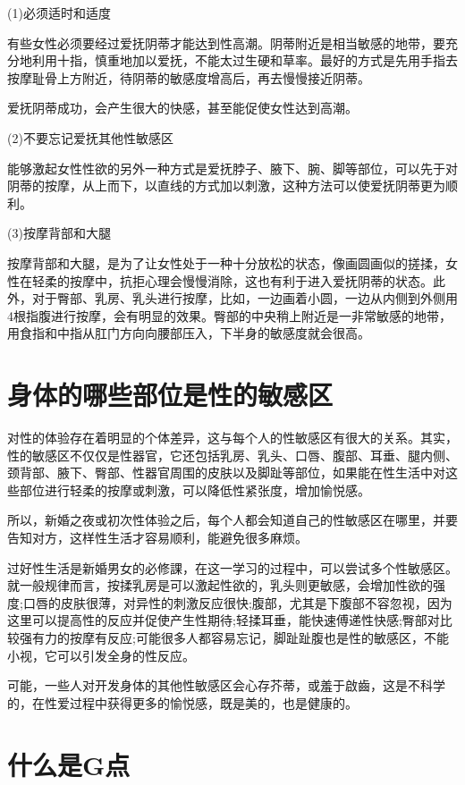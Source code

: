 \documentclass[12pt,UTF8]{ctexbook}
\begin{document}
(1)必须适时和适度

有些女性必须要经过爱抚阴蒂才能达到性高潮。阴蒂附近是相当敏感的地带，要充分地利用十指，慎重地加以爱抚，不能太过生硬和草率。最好的方式是先用手指去按摩耻骨上方附近，待阴蒂的敏感度增高后，再去慢慢接近阴蒂。

爱抚阴蒂成功，会产生很大的快感，甚至能促使女性达到高潮。

(2)不要忘记爱抚其他性敏感区

能够激起女性性欲的另外一种方式是爱抚脖子、腋下、腕、脚等部位，可以先于对阴蒂的按摩，从上而下，以直线的方式加以刺激，这种方法可以使爱抚阴蒂更为顺利。

(3)按摩背部和大腿

按摩背部和大腿，是为了让女性处于一种十分放松的状态，像画圆画似的搓揉，女性在轻柔的按摩中，抗拒心理会慢慢消除，这也有利于进入爱抚阴蒂的状态。此外，对于臀部、乳房、乳头进行按摩，比如，一边画着小圆，一边从内侧到外侧用4根指腹进行按摩，会有明显的效果。臀部的中央稍上附近是一非常敏感的地带，用食指和中指从肛门方向向腰部压入，下半身的敏感度就会很高。

\section{身体的哪些部位是性的敏感区}

对性的体验存在着明显的个体差异，这与每个人的性敏感区有很大的关系。其实，性的敏感区不仅仅是性器官，它还包括乳房、乳头、口唇、腹部、耳垂、腿内侧、颈背部、腋下、臀部、性器官周围的皮肤以及脚趾等部位，如果能在性生活中对这些部位进行轻柔的按摩或刺激，可以降低性紧张度，增加愉悦感。

所以，新婚之夜或初次性体验之后，每个人都会知道自己的性敏感区在哪里，并要告知对方，这样性生活才容易顺利，能避免很多麻烦。

过好性生活是新婚男女的必修課，在这一学习的过程中，可以尝试多个性敏感区。就一般规律而言，按揉乳房是可以激起性欲的，乳头则更敏感，会增加性欲的强度;口唇的皮肤很薄，对异性的刺激反应很快;腹部，尤其是下腹部不容忽视，因为这里可以提高性的反应并促使产生性期待;轻揉耳垂，能快速傅递性快感;臀部对比较强有力的按摩有反应;可能很多人都容易忘记，脚趾趾腹也是性的敏感区，不能小视，它可以引发全身的性反应。

可能，一些人对开发身体的其他性敏感区会心存芥蒂，或羞于啟齒，这是不科学的，在性爱过程中获得更多的愉悦感，既是美的，也是健康的。

\section{什么是G点}
\end{document}
